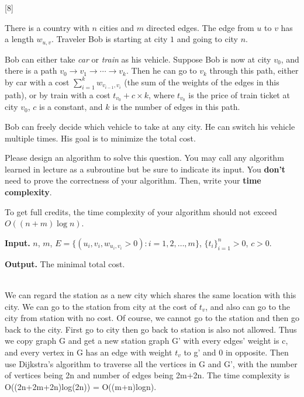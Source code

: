 [8]

There is a country with $n$ cities and $m$ directed edges. The edge from $u$ to $v$ has a length $w_{u,v}$.
Traveler Bob is starting at city $1$ and going to city $n$.

Bob can either take \emph{car} or \emph{train} as his vehicle.
Suppose Bob is now at city $v_0$, and there is a path $v_0\rightarrow v_1\rightarrow \cdots \rightarrow v_k$.
Then he can go to $v_k$ through this path, either by car with a cost $\sum_{i=1}^k w_{v_{i-1}, v_i}$ (the sum of the weights of the edges in this path), or by train with a cost $t_{v_0} + c\times k$, where $t_{v_0}$ is the price of train ticket at city $v_0$, $c$ is a constant, and $k$ is the number of edges in this path.

Bob can freely decide which vehicle to take at any city. He can switch his vehicle multiple times. His goal is to minimize the total cost.

Please design an algorithm to solve this question. You may call any algorithm learned in lecture as a subroutine but be sure to indicate its input. You \textbf{don't} need to prove the correctness of your algorithm. Then, write your \textbf{time complexity}.

To get full credits, the time complexity of your algorithm should not exceed $O\left(\left(n + m\right) \log n\right)$.

\textbf{Input. } $n$, $m$, $E=\{(u_i,v_i,w_{u_i,v_i}>0):i=1,2,\ldots, m\}$, $\{t_i\}_{i=1}^n>0$, $c>0$.

\textbf{Output. } The minimal total cost.

\begin{solution} \\
    We can regard the station as a new city which shares the same location with this city.
    We can go to the station from city at the cost of $t_v$, and also can go to the city from station with no cost.
    Of course, we cannot go to the station and then go back to the city. First go to city then go back to station is also not allowed.
    Thus we copy graph G and get a new station graph G' with every edges' weight is c, and every vertex in G has an edge with weight $t_v$ to g' and 0 in opposite.
    Then use Dijkstra's algorithm to traverse all the vertices in G and G', with the number of vertices being 2n and number of edges being 2m+2n.
    The time complexity is O((2n+2m+2n)log(2n)) = O((m+n)logn).
\end{solution}




